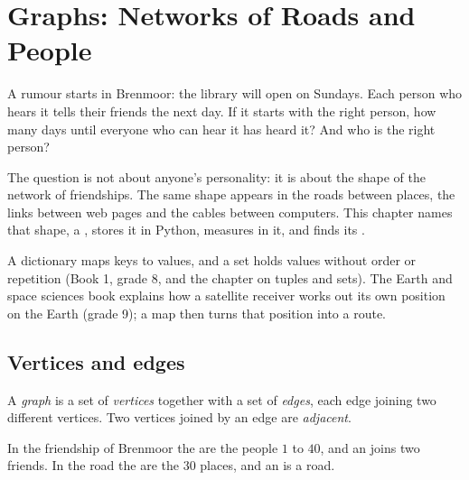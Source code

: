 \chapter{Graphs: Networks of Roads and People}\label{ch:g10:graphs-first-look}

A rumour starts in Brenmoor: the library will open on Sundays. Each person who hears it tells their friends the next
day. If it starts with the right person, how many days until everyone who can hear it has heard it? And who is the
right person?

The question is not about anyone's personality: it is about the shape of the network of friendships. The same shape
appears in the roads between places, the links between web pages and the cables between computers. This chapter
names that shape, a \emph{}, stores it in Python, measures  in it, and finds its .

\begin{recall}
A dictionary maps keys to values, and a set holds values without order or repetition (Book 1, grade 8, and the
chapter on tuples and sets). The Earth and space sciences book explains how a satellite receiver works out its own
position on the Earth (grade 9); a map then turns that position into a route.
\end{recall}

\section{Vertices and edges}\label{sec:g10:graphs-first-look:graphs}

\begin{definition}\label{def:g10:graphs-first-look:graph}
A \emph{graph} is a set of \emph{vertices} together with a set of
\emph{edges}, each edge joining two different vertices. Two vertices joined by an edge are
\emph{adjacent}.
\end{definition}

In the friendship  of Brenmoor the  are the people $1$ to $40$, and an  joins two friends. In the
road  the  are the $30$ places, and an  is a road.

